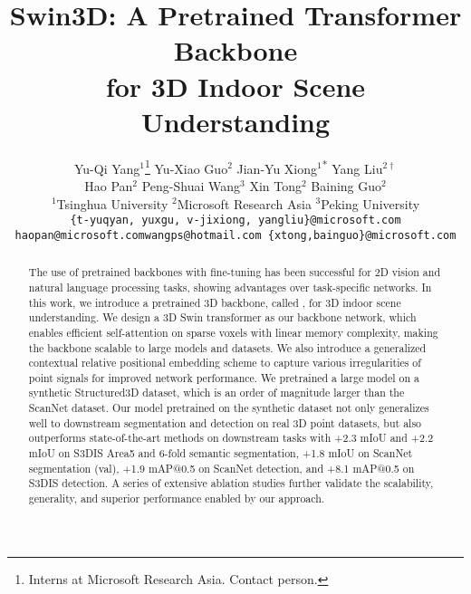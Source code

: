 \documentclass[10pt,twocolumn,letterpaper]{article}
\begin{document}
\title{Swin3D: A Pretrained Transformer Backbone \\for 3D Indoor Scene Understanding}

\author{
{Yu-Qi Yang}$^{1}$\thanks{Interns at Microsoft Research Asia. \textsuperscript{\dag}Contact person.}  \qquad
{Yu-Xiao Guo}$^{2}$\qquad
{Jian-Yu Xiong}$^1$\textsuperscript{*} \qquad
{Yang Liu}$^{2\dag}$ \\
{Hao Pan}$^{2}$\qquad
{Peng-Shuai Wang}$^{3}$\qquad
{Xin Tong}$^{2}$\qquad
{Baining Guo}$^{2}$ \\
\small {$^1${Tsinghua University}\quad \quad
  $^2${Microsoft Research Asia}  \quad\quad
  $^3${Peking University}}  \\
{\tt\small \{t-yuqyan, yuxgu, v-jixiong, yangliu\}@microsoft.com} \\
{\tt\small haopan@microsoft.com\quad wangps@hotmail.com\quad
\{xtong,bainguo\}@microsoft.com}
}

\maketitle
\ificcvfinal\thispagestyle{empty}\fi


\begin{abstract}
  The use of pretrained backbones with fine-tuning has been successful for 2D vision and natural language processing tasks, showing advantages over task-specific networks. In this work, we introduce a pretrained 3D backbone, called {\SST}, for 3D indoor scene understanding. We design a 3D Swin transformer as our backbone network, which enables efficient self-attention on sparse voxels with linear memory complexity, making the backbone scalable to large models and datasets. We also introduce a generalized contextual relative positional embedding scheme to capture various irregularities of point signals for improved network performance. We pretrained a large {\SST} model on a synthetic Structured3D dataset, which is an order of magnitude larger than the ScanNet dataset. Our model pretrained on the synthetic dataset not only generalizes well to downstream segmentation and detection on real 3D point datasets, but also outperforms state-of-the-art methods on downstream tasks with +2.3 mIoU and +2.2 mIoU on S3DIS Area5 and 6-fold semantic segmentation, +1.8 mIoU on ScanNet segmentation (val), +1.9 mAP@0.5 on ScanNet detection, and +8.1 mAP@0.5 on S3DIS detection. A series of extensive ablation studies further validate the scalability, generality, and superior performance enabled by our approach.  \end{abstract}
\end{document}

